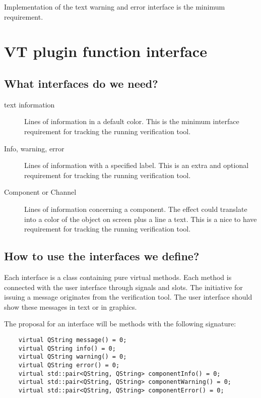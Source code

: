 \documentclass[a4paper,11pt,final]{article}
\begin{document}
Implementation of the text warning and error interface is the minimum
requirement. 

\section{VT plugin function interface}

\subsection{What interfaces do we need?}

\begin{description}
	\item[text information]	Lines of information in a default color. This is the
	minimum interface requirement for tracking the running verification tool.

	\item[Info, warning, error]	Lines of information with a specified label. This is an
	extra and optional requirement for tracking the running verification tool.

	\item[Component or Channel] Lines of information concerning a component. The effect could
	translate into a color of the object on screen plus a line a text. This is a nice to have
	requirement for tracking the running verification tool.

\end{description}

\subsection{How to use the interfaces we define?}

Each interface is a class containing pure virtual methods. Each method is connected with
the user interface through signals and slots. The initiative for issuing a message originates
from the verification tool. The user interface should show these messages in text or in graphics.

The proposal for an interface will be methods with the following signature:

\begin{verbatim}
	virtual QString message() = 0;
	virtual QString info() = 0;
	virtual QString warning() = 0;
	virtual QString error() = 0;
	virtual std::pair<QString, QString> componentInfo() = 0;
	virtual std::pair<QString, QString> componentWarning() = 0;
	virtual std::pair<QString, QString> componentError() = 0;
\end{verbatim}
\end{document}
